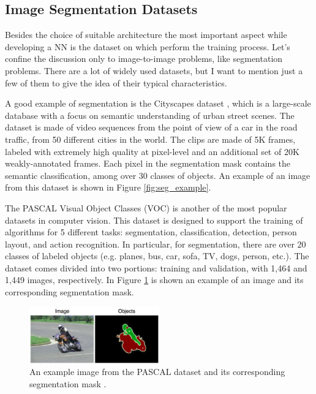 \documentclass[12pt,a4paper]{report}
\begin{document}
\subsection{Image Segmentation Datasets}
Besides the choice of suitable architecture the most important aspect while developing a NN is the dataset on which perform the training process. Let's confine the discussion only to image-to-image problems, like segmentation problems. There are a lot of widely used datasets, but I want to mention just a few of them to give the idea of their typical characteristics.

A good example of segmentation is the Cityscapes dataset \cite{Cityscapes}, which is a large-scale database with a focus on semantic understanding of urban street scenes. The dataset is made of video sequences from the point of view of a car in the road traffic, from 50 different cities in the world. The clips are made of 5K frames, labeled with extremely high quality at pixel-level and an additional set of 20K weakly-annotated frames. Each pixel in the segmentation mask contains the semantic classification, among over 30 classes of objects. An example of an image from this dataset is shown in Figure \ref{fig:seg_example}.

The PASCAL Visual Object Classes (VOC) \cite{PASCAL} is another of the most popular datasets in computer vision. This dataset is designed to support the training of algorithms for 5 different tasks: segmentation, classification, detection, person layout, and action recognition. In particular, for segmentation, there are over 20 classes of labeled objects (e.g. planes, bus, car, sofa, TV, dogs, person, etc.). The dataset comes divided into two portions: training and validation, with 1,464 and 1,449 images, respectively. In Figure \ref{fig:PASCAL} is shown an example of an image and its corresponding segmentation mask.

    \begin{figure}
        \centering
        \includegraphics[width = 0.5\textwidth]{images/PASCAL}
        \caption{An example image from the PASCAL dataset and its corresponding segmentation mask \cite{PASCAL}.}
        \label{fig:PASCAL}
    \end{figure}
\end{document}
